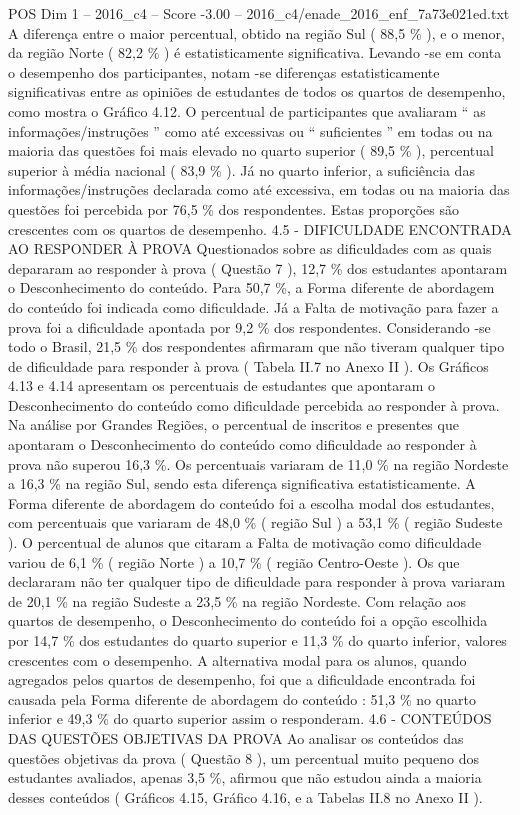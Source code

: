 \begin{textsample}{POS Dim 1 – 2016\_c4 – Score -3.00 – 2016\_c4/enade\_2016\_enf\_7a73e021ed.txt}
A diferença entre o maior percentual, obtido na região Sul ( 88,5 \% ), e o menor, da região Norte ( 82,2 \% ) é estatisticamente significativa.
Levando -se em conta o desempenho dos participantes, notam -se diferenças estatisticamente significativas entre as opiniões de estudantes de todos os quartos de desempenho, como mostra o Gráfico 4.12.
O percentual de participantes que avaliaram “ as informações/instruções ” como até excessivas ou “ suficientes ” em todas ou na maioria das questões foi mais elevado no quarto superior ( 89,5 \% ), percentual superior à média nacional ( 83,9 \% ).
Já no quarto inferior, a suficiência das informações/instruções declarada como até excessiva, em todas ou na maioria das questões foi percebida por 76,5 \% dos respondentes.
Estas proporções são crescentes com os quartos de desempenho. 4.5 - DIFICULDADE ENCONTRADA AO RESPONDER À PROVA Questionados sobre as dificuldades com as quais depararam ao responder à prova ( Questão 7 ), 12,7 \% dos estudantes apontaram o Desconhecimento do conteúdo.
Para 50,7 \%, a Forma diferente de abordagem do conteúdo foi indicada como dificuldade.
Já a Falta de motivação para fazer a prova foi a dificuldade apontada por 9,2 \% dos respondentes.
Considerando -se todo o Brasil, 21,5 \% dos respondentes afirmaram que não tiveram qualquer tipo de dificuldade para responder à prova ( Tabela II.7 no Anexo II ).
Os Gráficos 4.13 e 4.14 apresentam os percentuais de estudantes que apontaram o Desconhecimento do conteúdo como dificuldade percebida ao responder à prova.
Na análise por Grandes Regiões, o percentual de inscritos e presentes que apontaram o Desconhecimento do conteúdo como dificuldade ao responder à prova não superou 16,3 \%.
Os percentuais variaram de 11,0 \% na região Nordeste a 16,3 \% na região Sul, sendo esta diferença significativa estatisticamente.
A Forma diferente de abordagem do conteúdo foi a escolha modal dos estudantes, com percentuais que variaram de 48,0 \% ( região Sul ) a 53,1 \% ( região Sudeste ).
O percentual de alunos que citaram a Falta de motivação como dificuldade variou de 6,1 \% ( região Norte ) a 10,7 \% ( região Centro-Oeste ).
Os que declararam não ter qualquer tipo de dificuldade para responder à prova variaram de 20,1 \% na região Sudeste a 23,5 \% na região Nordeste.
Com relação aos quartos de desempenho, o Desconhecimento do conteúdo foi a opção escolhida por 14,7 \% dos estudantes do quarto superior e 11,3 \% do quarto inferior, valores crescentes com o desempenho.
A alternativa modal para os alunos, quando agregados pelos quartos de desempenho, foi que a dificuldade encontrada foi causada pela Forma diferente de abordagem do conteúdo : 51,3 \% no quarto inferior e 49,3 \% do quarto superior assim o responderam. 4.6 - CONTEÚDOS DAS QUESTÕES OBJETIVAS DA PROVA Ao analisar os conteúdos das questões objetivas da prova ( Questão 8 ), um percentual muito pequeno dos estudantes avaliados, apenas 3,5 \%, afirmou que não estudou ainda a maioria desses conteúdos ( Gráficos 4.15, Gráfico 4.16, e a Tabelas II.8 no Anexo II ).

\end{textsample}
